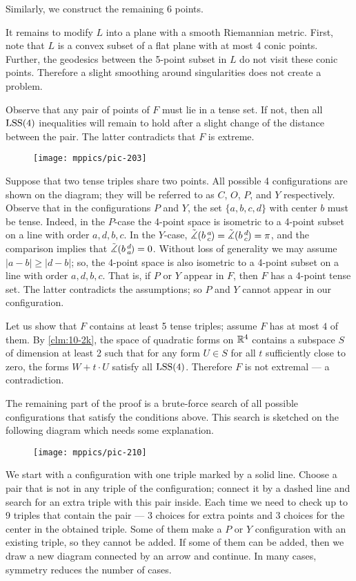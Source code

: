 \documentclass{article}
\begin{document}
Similarly, we construct the remaining 6 points.

It remains to modify $L$ into a plane with a smooth Riemannian metric.
First, note that $L$ is a convex subset of a flat plane with at most 4 conic points.
Further, the geodesics between the 5-point subset in $L$ do not visit these conic points.
Therefore a slight smoothing around singularities does not create a problem.
\qeds


Observe that any pair of points of $F$ must lie in a tense set.
If not, then all $\mathrm{LSS}(4)$ inequalities will remain to hold after a slight change of the distance between the pair.
The latter contradicts that $F$ is extreme.

\begin{wrapfigure}[5]{l}{60mm}
\vskip-2mm
\centering
\texttt{[image: mppics/pic-203]}
\label{page:COPY}
\end{wrapfigure}

Suppose that two tense triples share two points.
All possible 4 configurations are shown on the diagram; they will be referred to as $C$, $O$, $P$, and $Y$ respectively.
Observe that in the configurations $P$ and $Y$, the set $\{a,b,c,d\}$ with center $b$ must be tense.
Indeed, in the $P$-case the 4-point space is isometric to a 4-point subset on a line with order $a,d,b,c$.
In the $Y$-case, $\tilde\measuredangle(b\,{}^{a}_{c}\hspace{-0.2ex})=\tilde\measuredangle(b\,{}^{d}_{c}\hspace{-0.2ex})=\pi$, and the comparison implies that $\tilde\measuredangle(b\,{}^{d}_{a}\hspace{-0.2ex})=0$.
Without loss of generality we may assume $|a-b|\ge |d-b|$;
so, the 4-point space is also isometric to a 4-point subset on a line with order $a,d,b,c$.
That is, if $P$ or $Y$ appear in $F$, then $F$ has a 4-point tense set.
The latter contradicts the assumptions; so $P$ and $Y$ cannot appear in our configuration.

Let us show that $F$ contains at least 5 tense triples;
assume $F$ has at most $4$ of them.
By \ref{clm:10-2k}, the space of quadratic forms on $\mathbb{R}^4$ contains a subspace $S$ of dimension at least 2 such that for any form $U\in S$ for all $t$ sufficiently close to zero, the forms $W+t\cdot U$ satisfy all $\mathrm{LSS}(4)$.
Therefore $F$ is not extremal --- a contradiction.

The remaining part of the proof is a brute-force search of all possible configurations that satisfy the conditions above.
This search is sketched on the following diagram which needs some explanation.
\begin{figure}[ht!]
\centering
\texttt{[image: mppics/pic-210]}
\end{figure}\label{pic-210}
We start with a configuration with one triple marked by a solid line.
Choose a pair that is not in any triple of the configuration;
connect it by a dashed line and search for an extra triple with this pair inside.
Each time we need to check up to 9 triples that contain the pair --- 3 choices for extra points and 3 choices for the center in the obtained triple.
Some of them make a $P$ or $Y$ configuration with an existing triple, so they cannot be added.
If some of them can be added, then we draw a new diagram connected by an arrow and continue.
In many cases, symmetry reduces the number of cases.
 
\end{document}
